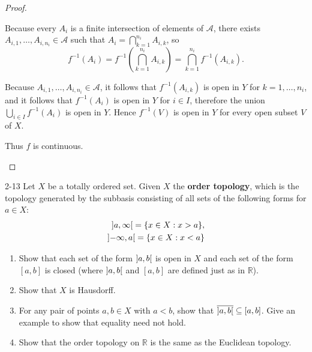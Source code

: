 \begin{proof}
\begin{enumerate}[label={(\alph*)}]
		      Because every $A_{i}$ is a finite intersection of elements of $\mathscr{A}$, there exists $A_{i,1}, \ldots, A_{i, n_{i}}\in\mathscr{A}$ such that $A_{i} = \bigcap^{n_{i}}_{k=1}A_{i,k}$, so
		      \[
			      f^{-1}(A_{i}) = f^{-1}\left(\bigcap^{n_{i}}_{k=1}A_{i,k}\right) = \bigcap^{n_{i}}_{k=1}f^{-1}(A_{i, k}).
		      \]

		      Because $A_{i,1}, \ldots, A_{i, n_{i}}\in\mathscr{A}$, it follows that $f^{-1}(A_{i,k})$ is open in $Y$ for $k = 1,\ldots, n_{i}$, and it follows that $f^{-1}(A_{i})$ is open in $Y$ for $i\in I$, therefore the union $\bigcup_{i\in I}f^{-1}(A_{i})$ is open in $Y$. Hence $f^{-1}(V)$ is open in $Y$ for every open subset $V$ of $X$.

		      Thus $f$ is continuous.
	\end{enumerate}
\end{proof}

\begin{problem}{2-13}
Let $X$ be a totally ordered set. Given $X$ the \textbf{order topology}, which is the topology generated by the subbasis consisting of all sets of the following forms for $a\in X$:
\[
	\begin{split}
		\left]{a, \infty}\right[ = \{ x\in X : x > a \}, \\
		\left]{-\infty, a}\right[ = \{ x\in X: x < a \}
	\end{split}
\]
\begin{enumerate}[label={(\alph*)}]
	\item Show that each set of the form $\left]{a,b}\right[$ is open in $X$ and each set of the form $\left[a, b\right]$ is closed (where $\left]{a,b}\right[$ and $\left[a, b\right]$ are defined just as in $\mathbb{R}$).
	\item Show that $X$ is Hausdorff.
	\item For any pair of points $a, b\in X$ with $a < b$, show that $\overline{\left]{a,b}\right[} \subseteq \left[a, b\right]$. Give an example to show that equality need not hold.
	\item Show that the order topology on $\mathbb{R}$ is the same as the Euclidean topology.
\end{enumerate}
\end{problem}


